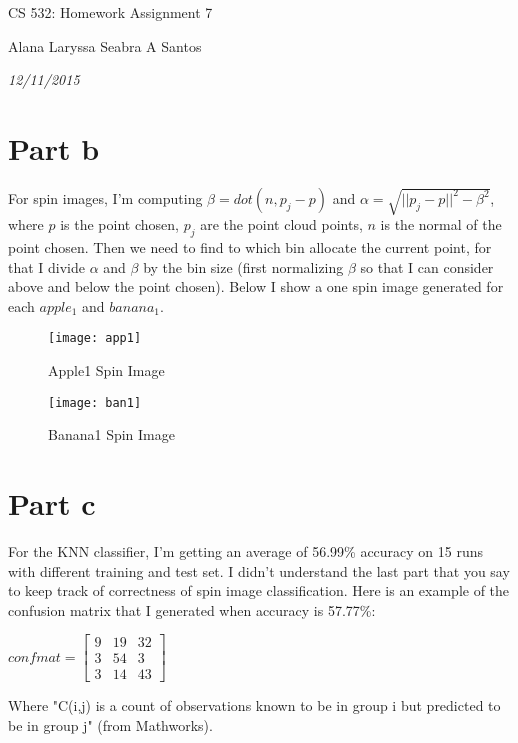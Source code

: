 \documentclass{article}
\begin{document}
\centerline{\sc \large CS 532: Homework Assignment 7}
\vspace{.2pc}
\centerline{Alana Laryssa Seabra A Santos}
\centerline{\it 12/11/2015}
\vspace{.4pc}

\section{Part b}

For spin images, I'm computing $\beta = dot(n,p_j - p)$ and $\alpha = \sqrt{||p_j - p||^2 - \beta^2}$, where $p$ is the point chosen, $p_j$ are the point cloud points, $n$ is the normal of the point chosen. Then we need to find to which bin allocate the current point, for that I divide $\alpha$ and $\beta$ by the bin size (first normalizing $\beta$ so that I can consider above and below the point chosen).
Below I show a one spin image generated for each $apple_1$ and $banana_1$.

\begin{figure}[ht]
\centering
\begin{minipage}[b]{0.45\linewidth}
  \texttt{[image: app1]}
  \caption{Apple1 Spin Image}
  \label{fig:minipage1}
\end{minipage}
\quad
\begin{minipage}[b]{0.45\linewidth}
  \texttt{[image: ban1]}
  \caption{Banana1 Spin Image}
  \label{fig:minipage2}
\end{minipage}
\end{figure}


\section{Part c}

For the KNN classifier, I'm getting an average of 56.99\% accuracy on 15 runs with different training and test set.
I didn't understand the last part that you say to keep track of correctness of spin image classification. Here is an example of the confusion matrix that I generated when accuracy is 57.77\%:

$confmat = \begin{bmatrix} 9 & 19 & 32 \\ 3 & 54 & 3 \\ 3 & 14 & 43 \end{bmatrix}$

Where "C(i,j) is a count of observations known to be in group i but predicted to be in group j" (from Mathworks).
\end{document}
